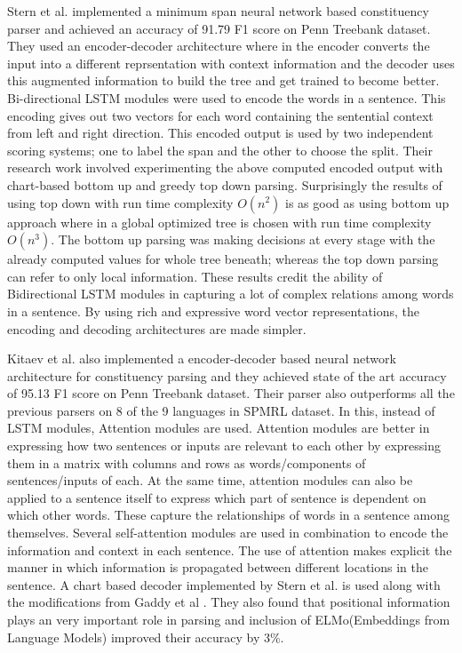 \documentclass[a4paper, 11pt]{article}
\begin{document}
Stern et al. \parencite*{Stern2017} implemented a minimum span neural network based constituency parser and achieved an accuracy of 91.79 F1 score on Penn Treebank dataset. They used an encoder-decoder architecture where in the encoder converts the input into a different reprsentation with context information and the decoder uses this augmented information to build the tree and get trained to become better. Bi-directional LSTM modules were used to encode the words in a sentence. This encoding gives out two vectors for each word containing the sentential context from left and right direction. This encoded output is used by two independent scoring systems; one to label the span and the other to choose the split. Their research work involved experimenting the above computed encoded output with chart-based bottom up and greedy top down parsing. Surprisingly the results of using top down with run time complexity $O(n^2)$ is as good as using bottom up approach where in a global optimized tree is chosen with run time complexity $O(n^3)$. The bottom up parsing was making decisions at every stage with the already computed values for whole tree beneath; whereas the top down parsing can refer to only local information. These results credit the ability of Bidirectional LSTM modules in capturing a lot of complex relations among words in a sentence. By using rich and expressive word vector representations, the encoding and decoding architectures are made simpler. 

Kitaev et al. \parencite*{Kitaev2019} also implemented a encoder-decoder based neural network architecture for constituency parsing and they achieved state of the art accuracy of 95.13 F1 score on Penn Treebank dataset. Their parser also outperforms all the previous parsers on 8 of the 9 languages in SPMRL dataset. In this, instead of LSTM modules, Attention modules \parencite*{Vaswani2017} are used. Attention modules are better in expressing how two sentences or inputs are relevant to each other by expressing them in a matrix with columns and rows as words/components of sentences/inputs of each. At the same time, attention modules can also be applied to a sentence itself to express which part of sentence is dependent on which other words. These capture the relationships of words in a sentence among themselves. Several self-attention modules are used in combination to encode the information and context in each sentence. The use of attention makes explicit the manner in which information is propagated between different locations in the sentence. A chart based decoder implemented by Stern et al. \parencite*{Stern2017} is used along with the modifications from Gaddy et al \parencite*{Gaddy2018}. They also found that positional information plays an very important role in parsing and inclusion of ELMo(Embeddings from Language Models) improved their accuracy by 3\%. 
\end{document}
